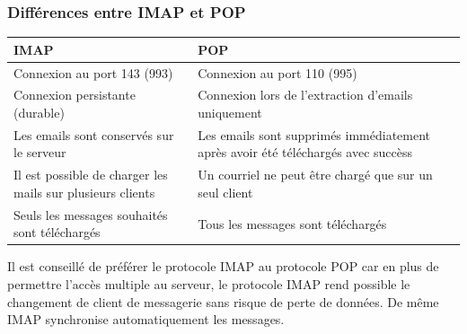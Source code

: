 \documentclass[a4paper,12pt,french]{report} %
\begin{document}
\subsubsection{Différences entre IMAP et POP}
\cesure
\begin{table}[H]
	\centering
\begin{tabu}{|X[l]|X[l]|}
	\hline
	\centering \textbf{IMAP} & \centering \textbf{POP}  \\
	\hline
	Connexion au port 143 (993) & Connexion au port 110 (995) \\
	\hline	
	Connexion persistante (durable) & Connexion lors de l'extraction d'emails uniquement \\
	\hline
	Les emails sont conservés sur le serveur & Les emails sont supprimés immédiatement après avoir été téléchargés avec succèss \\
	\hline
	Il est possible de charger les mails sur plusieurs clients & Un courriel ne peut être chargé que sur un seul client \\
	\hline
	Seuls les messages souhaités sont téléchargés & Tous les messages sont téléchargés \\
	\hline	
\end{tabu}
\end{table}
\nocesure

Il est conseillé de préférer le protocole IMAP au protocole POP car en plus de permettre l'accès multiple au serveur, le protocole IMAP rend possible le changement de client de messagerie sans risque de perte de données. De même IMAP synchronise automatiquement les messages.
\end{document}
